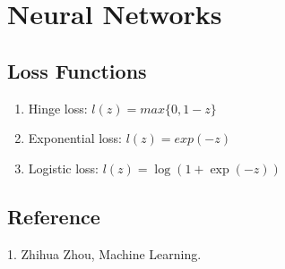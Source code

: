 \section{Neural Networks}

\subsection{Loss Functions}

\begin{enumerate}
\item Hinge loss: $l(z) = max\{0,1-z\}$
\item Exponential loss: $l(z) = exp(-z)$
\item Logistic loss: $l(z) = \log(1+\exp(-z))$
\end{enumerate}

\subsection{Reference}

1. Zhihua Zhou, Machine Learning.
